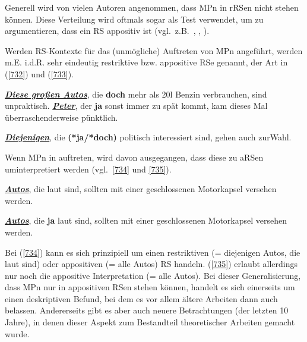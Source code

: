 Generell wird von vielen Autoren angenommen, dass MPn in rRSen nicht stehen können. Diese Verteilung wird oftmals sogar als Test verwendet, um zu argumentieren, dass ein RS appositiv ist (vgl.\ z.B.\ \citealt[3]{Becker1978}, \citealt[2007]{Zifonun1997}, \citealt[30]{Holler2005}). 

Werden RS-Kontexte für das (unmögliche) Auftreten von MPn angeführt, werden m.E. i.d.R. sehr eindeutig restriktive bzw. appositive RSe genannt, der Art in (\ref{732}) und (\ref{733}).\largerpage

\begin{exe}
	\ex\label{732} 
		\begin{xlist}	
			\ex\label{732a} \ul{\textit{\textbf{Diese großen Autos}}}, die \textbf{doch} mehr als 20l Benzin verbrauchen, sind unpraktisch.
			\hfill\hbox{\citet[166]{Helbig1994}}
			\ex\label{732b} \ul{\textit{\textbf{Peter}}}, der \textbf{ja} sonst immer zu spät kommt, kam dieses Mal überraschenderweise pünktlich.		  
			\hfill\hbox{\citet[135]{Dahl1988}}
		\end{xlist}
\end{exe}

\begin{exe}
	\ex\label{733} 
	\ul{\textit{\textbf{Diejenigen}}}, die \textbf{(*ja/*doch)} politisch interessiert sind, gehen auch zur\linebreak Wahl.
	\hbox{}\hfill\hbox{\citet[30]{Holler2005}}	
\end{exe}
Wenn MPn in  auftreten, wird davon ausgegangen, dass diese zu aRSen uminterpretiert werden (vgl.\ \ref{734} und \ref{735}).

\begin{exe}
	\ex\label{734} 
	\ul{\textit{\textbf{Autos}}}, die laut sind, sollten mit einer geschlossenen Motorkapsel versehen werden.
\end{exe}

\begin{exe}
	\ex\label{735} 
	\ul{\textit{\textbf{Autos}}}, die \textbf{ja} laut sind, sollten mit einer geschlossenen Motorkapsel versehen werden.
	\hfill\hbox{\citet[151]{Hartmann1986}}
\end{exe}
Bei (\ref{734}) kann es sich prinzipiell um einen restriktiven (= diejenigen Autos, die laut sind) oder appositiven (= alle Autos) RS handeln. (\ref{735}) erlaubt allerdings nur noch die appositive Interpretation (= alle Autos). Bei dieser Generalisierung, dass MPn nur in appositiven RSen stehen können, handelt es sich einerseits um einen deskriptiven Befund, bei dem es vor allem ältere Arbeiten dann auch belassen. Andererseits gibt es aber auch neuere Betrachtungen (der letzten 10 Jahre), in denen dieser Aspekt zum Bestandteil theoretischer Arbeiten gemacht wurde.

